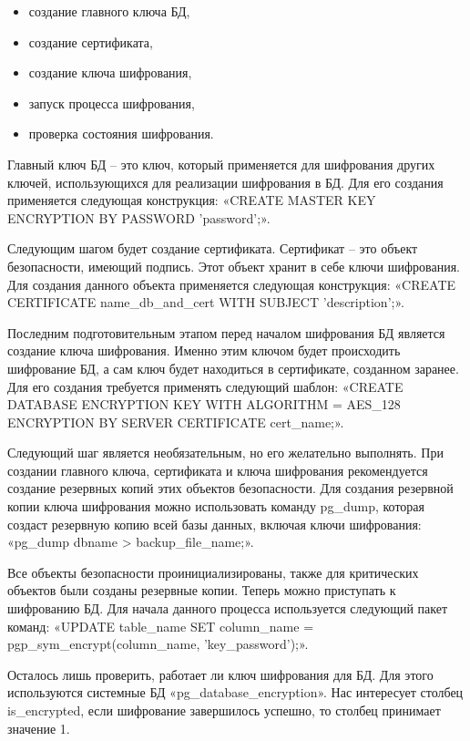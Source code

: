 \begin{itemize}
    \item создание главного ключа БД,
    \item создание сертификата,
    \item создание ключа шифрования,
    \item запуск процесса шифрования,
    \item проверка состояния шифрования.
\end{itemize}

Главный ключ БД – это ключ, который применяется для шифрования других ключей, использующихся для реализации шифрования в БД. Для его создания применяется следующая конструкция: «CREATE MASTER KEY ENCRYPTION BY PASSWORD 'password';».

Следующим шагом будет создание сертификата. Сертификат – это объект безопасности, имеющий подпись. Этот объект хранит в себе ключи шифрования. Для создания данного объекта применяется следующая конструкция: «CREATE CERTIFICATE name\_db\_and\_cert WITH SUBJECT 'description';».

Последним подготовительным этапом перед началом шифрования БД является создание ключа шифрования. Именно этим ключом будет происходить шифрование БД, а сам ключ будет находиться в сертификате, созданном заранее. Для его создания требуется применять следующий шаблон: «CREATE DATABASE ENCRYPTION KEY WITH ALGORITHM = AES\_128 ENCRYPTION BY SERVER CERTIFICATE cert\_name;».

Следующий шаг является необязательным, но его желательно выполнять. При создании главного ключа, сертификата и ключа шифрования рекомендуется создание резервных копий этих объектов безопасности. Для создания резервной копии ключа шифрования можно использовать команду pg\_dump, которая создаст резервную копию всей базы данных, включая ключи шифрования: «pg\_dump dbname > backup\_file\_name;».

Все объекты безопасности проинициализированы, также для критических объектов были созданы резервные копии. Теперь можно приступать к шифрованию БД. Для начала данного процесса используется следующий пакет команд: «UPDATE table\_name SET column\_name = pgp\_sym\_encrypt(column\_name, 'key\_password');».

Осталось лишь проверить, работает ли ключ шифрования для БД. Для этого используются системные БД «pg\_database\_encryption». Нас интересует столбец is\_encrypted, если шифрование завершилось успешно, то столбец принимает значение 1.




